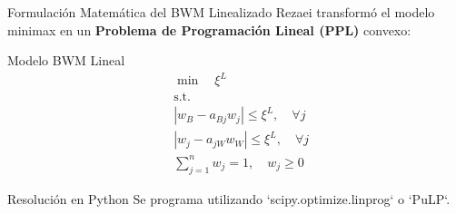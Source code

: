 \documentclass[aspectratio=169, 10pt]{beamer}
\begin{document}
\begin{frame}{Formulación Matemática del BWM Linealizado}
    \small
    Rezaei transformó el modelo minimax en un \textbf{Problema de Programación Lineal (PPL)} convexo:
    \begin{block}{Modelo BWM Lineal}
        \scriptsize
        \[
        \begin{aligned}
            & \min \quad \xi^L \\
            & \text{s.t.} \\
            & \left| w_B - a_{Bj} w_j \right| \le \xi^L, \quad \forall j \\
            & \left| w_j - a_{jW} w_W \right| \le \xi^L, \quad \forall j \\
            & \sum_{j=1}^n w_j = 1, \quad w_j \ge 0
        \end{aligned}
        \]
    \end{block}
    \begin{exampleblock}{Resolución en Python}
        \scriptsize
        Se programa utilizando `scipy.optimize.linprog` o `PuLP`.
    \end{exampleblock}
\end{frame}
\end{document}
